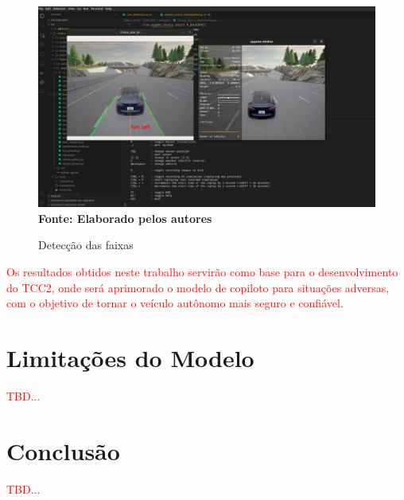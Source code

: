 \documentclass[a4paper,12pt,Times]{article}
\begin{document}
\begin{figure}[H]
    \centering
    \caption{Detecção das faixas}
    \includegraphics[scale=0.25]{figuras/Lane-detect.jpeg}\captionsetup{justification=centering}
  \vspace{-0.2cm}
     \\\textbf{\footnotesize Fonte: Elaborado pelos autores}
    \label{fig:lane-detect3}
\end{figure}

\textcolor{red}{Os resultados obtidos neste trabalho servirão como base para o desenvolvimento do TCC2, onde será aprimorado o modelo de copiloto para situações adversas, com o objetivo de tornar o veículo autônomo mais seguro e confiável.}
\section{Limitações do Modelo}
\textcolor{red}{TBD...}
\section{Conclusão}
\textcolor{red}{TBD...}



 
 





\newpage
\singlespace{
  
}
\end{document}
